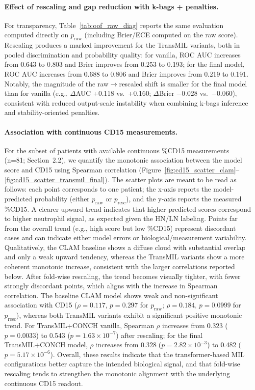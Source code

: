 \paragraph{Effect of rescaling and gap reduction with k-bags + penalties.}
For transparency, Table~\ref{tab:oof_raw_diag} reports the same evaluation computed directly on $p_{\mathrm{raw}}$ (including Brier/ECE computed on the raw score).
Rescaling produces a marked improvement for the TransMIL variants, both in pooled discrimination and probability quality: for vanilla, ROC AUC increases from 0.643 to 0.803 and Brier improves from 0.253 to 0.193; for the final model, ROC AUC increases from 0.688 to 0.806 and Brier improves from 0.219 to 0.191.
Notably, the magnitude of the raw$\rightarrow$rescaled shift is smaller for the final model than for vanilla (e.g., $\Delta$AUC +0.118 vs.\ +0.160; $\Delta$Brier $-0.028$ vs.\ $-0.060$), consistent with reduced output-scale instability when combining k-bags inference and stability-oriented penalties.

\paragraph{Association with continuous CD15 measurements.}
For the subset of patients with available continuous \%CD15 measurements (n=81; Section~2.2), we quantify the monotonic association between the model score and CD15 using Spearman correlation (Figure~\ref{fig:cd15_scatter_clam}--\ref{fig:cd15_scatter_transmil_final}).
The scatter plots are meant to be read as follows: each point corresponds to one patient; the x-axis reports the model-predicted probability (either $p_{\mathrm{raw}}$ or $p_{\mathrm{resc}}$), and the y-axis reports the measured \%CD15. A clearer upward trend indicates that higher predicted scores correspond to higher neutrophil signal, as expected given the HN/LN labeling. Points far from the overall trend (e.g., high score but low \%CD15) represent discordant cases and can indicate either model errors or biological/measurement variability.
Qualitatively, the CLAM baseline shows a diffuse cloud with substantial overlap and only a weak upward tendency, whereas the TransMIL variants show a more coherent monotonic increase, consistent with the larger correlations reported below. After fold-wise rescaling, the trend becomes visually tighter, with fewer strongly discordant points, which aligns with the increase in Spearman correlation.
The baseline CLAM model shows weak and non-significant association with CD15 ($\rho=0.117$, $p=0.297$ for $p_{\mathrm{raw}}$; $\rho=0.184$, $p=0.0999$ for $p_{\mathrm{resc}}$), whereas both TransMIL variants exhibit a significant positive monotonic trend.
For TransMIL+CONCH vanilla, Spearman $\rho$ increases from 0.323 ($p=0.0033$) to 0.543 ($p=1.63\times10^{-7}$) after rescaling; for the final TransMIL+CONCH model, $\rho$ increases from 0.328 ($p=2.82\times10^{-3}$) to 0.482 ($p=5.17\times10^{-6}$).
Overall, these results indicate that the transformer-based MIL configurations better capture the intended biological signal, and that fold-wise rescaling tends to strengthen the monotonic alignment with the underlying continuous CD15 readout.

